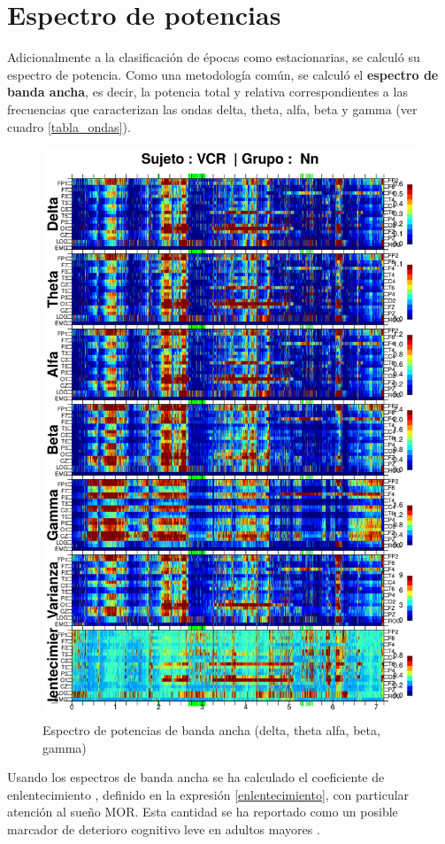 \section{Espectro de potencias}

Adicionalmente a la clasificación de épocas como estacionarias, se calculó su espectro de potencia. 
Como una metodología común, se calculó el \textbf{espectro de banda ancha},
es decir, la potencia total y relativa correspondientes a las frecuencias que caracterizan las ondas 
delta, theta, alfa, beta y gamma (ver cuadro \ref{tabla_ondas}).

\begin{figure}
\centering
\includegraphics[width=0.8\linewidth]
{./enlentecimiento/VCNNS1_espectral_total.png} 
\caption[Espectro de potencias de banda ancha]{Espectro de potencias de banda ancha (delta, theta
alfa, beta, gamma)}
\end{figure}

Usando los espectros de banda ancha se ha calculado el coeficiente de enlentecimiento \lento, 
definido en la 
expresión \ref{enlentecimiento}, con particular atención al sueño MOR. Esta cantidad
se ha reportado como un posible marcador de deterioro cognitivo leve en adultos mayores 
\cite{Brayet16}.

